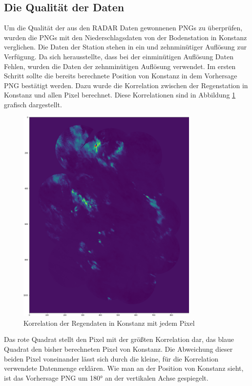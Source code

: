 \subsection{Die Qualität der Daten}
Um die Qualität der aus den RADAR Daten gewonnenen PNGs zu überprüfen, wurden die PNGs mit den Niederschlagsdaten von der 
Bodenstation in Konstanz verglichen. 
Die Daten der Station stehen in ein und zehnminütiger Auflösung zur Verfügung. 
Da sich herausstellte, dass bei der einminütigen Auflösung Daten Fehlen, wurden die Daten der zehnminütigen Auflösung verwendet.
Im ersten Schritt sollte die bereits berechnete Position von Konstanz in dem Vorhersage PNG bestätigt werden.
Dazu wurde die Korrelation zwischen der Regenstation in Konstanz und allen Pixel berechnet. 
Diese Korrelationen sind in Abbildung \ref{fig:karte_korrelation} grafisch dargestellt. 
\begin{figure}[H]
    \centering
    \includegraphics[width=0.8\textwidth,angle=0]{abb/Korrelation_Karte}
    \caption[Korrelationen der Regendaten in Kartenform]{Korrelation der Regendaten in Konstanz mit jedem Pixel}
   \label{fig:karte_korrelation}
\end{figure}
Das rote Quadrat stellt den Pixel mit der größten Korrelation dar, das blaue Quadrat den bisher berechneten Pixel von Konstanz. 
Die Abweichung dieser beiden Pixel voneinander lässt sich durch die kleine, für die Korrelation verwendete Datenmenge erklären. 
Wie man an der Position von Konstanz sieht, ist das Vorhersage PNG um 180° an der vertikalen Achse gespiegelt.

